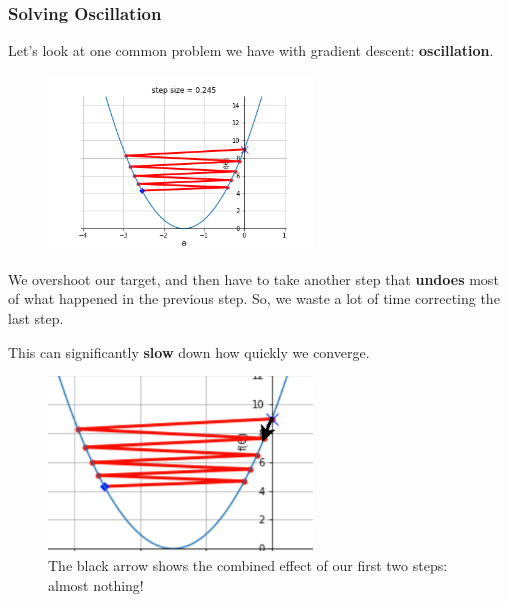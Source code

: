         \subsubsection{Solving Oscillation}
    
            Let's look at one common problem we have with gradient descent: \textbf{oscillation}. 
            
            \begin{figure}[H]
                \centering
                    \includegraphics[width=70mm,scale=0.5]{images/gradient_descent_images/oscillate.png}
            \end{figure}
            
            We overshoot our target, and then have to take another step that \textbf{undoes} most of what happened in the previous step. So, we waste a lot of time correcting the last step.
                
            This can significantly \textbf{slow} down how quickly we converge.
                
            \begin{figure}[H]
                \centering
                    \includegraphics[width=70mm,scale=0.5]{images/nn_2_images/oscillate_zoom.png}
                
                \caption*{The black arrow shows the combined effect of our first two steps: almost nothing!}
            \end{figure}
            
